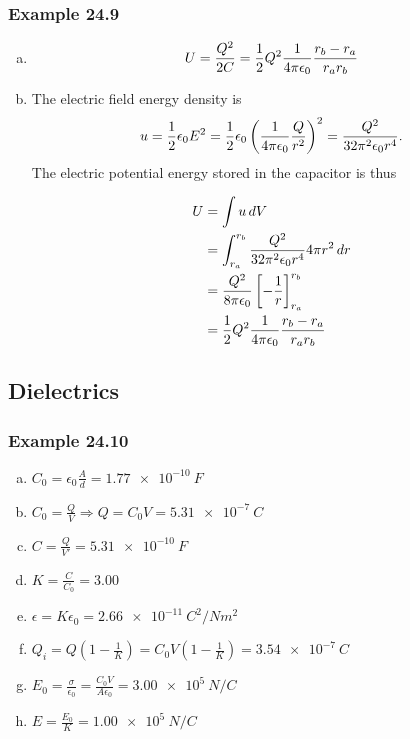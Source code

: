 \documentclass{article}
\begin{document}
\subsubsection{Example 24.9}

\begin{enumerate}[(a)]
  \item \[U = \frac{Q^2}{2 C} = \frac{1}{2} Q^2 \frac{1}{4 \pi \epsilon_0} \frac{r_b - r_a}{r_a r_b}\]

  \item The electric field energy density is \[u = \frac{1}{2} \epsilon_0 E^2 = \frac{1}{2} \epsilon_0 \left( \frac{1}{4 \pi \epsilon_0} \frac{Q}{r^2} \right)^2 = \frac{Q^2}{32 \pi^2 \epsilon_0 r^4}.\] The electric potential energy stored in the capacitor is thus

        \begin{align*}
          U & = \int u \,dV                                                          \\
            & = \int_{r_a}^{r_b} \frac{Q^2}{32 \pi^2 \epsilon_0 r^4} 4 \pi r^2 \,dr  \\
            & = \frac{Q^2}{8 \pi \epsilon_0} \left[ -\frac{1}{r} \right]_{r_a}^{r_b} \\
            & = \frac{1}{2} Q^2 \frac{1}{4 \pi \epsilon_0} \frac{r_b - r_a}{r_a r_b}
        \end{align*}
\end{enumerate}

\subsection{Dielectrics}

\subsubsection{Example 24.10}

\begin{enumerate}[(a)]
  \item $C_0 = \epsilon_0 \frac{A}{d} = \qty{1.77e-10}{F}$

  \item $C_0 = \frac{Q}{V} \Rightarrow Q = C_0 V = \qty{5.31e-7}{C}$

  \item $C = \frac{Q}{V'} = \qty{5.31e-10}{F}$

  \item $K = \frac{C}{C_0} = 3.00$

  \item $\epsilon = K \epsilon_0 = \qty{2.66e-11}{C^2 / N m^2}$

  \item $Q_i = Q \left( 1 - \frac{1}{K} \right) = C_0 V \left( 1 - \frac{1}{K} \right) = \qty{3.54e-7}{C}$

  \item $E_0 = \frac{\sigma}{\epsilon_0} = \frac{C_0 V}{A \epsilon_0} = \qty{3.00e5}{N/C}$

  \item $E = \frac{E_0}{K} = \qty{1.00e5}{N/C}$
\end{enumerate}
\end{document}
